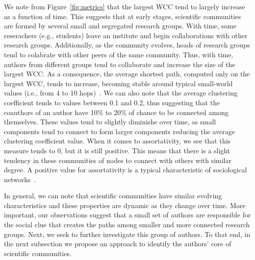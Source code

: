 We note from Figure~\ref{fig:metrics} that the largest WCC tend to largely increase as a function of time. This suggests that at early
stages, scientific communities are formed by several small and segregated research groups. With time, some reserachers (e.g., students) leave an institute and begin collaborations
with other research groups. Additionally, as the community evolves, heads of  research groups tend to colabrate with other peers of the same community. Thus, with time, authors
from different groups tend to collaborate and increase the size of the largest WCC. As a consequence, the average shortest path, computed only on the largest
WCC, tends to increase, becoming stable around typical small-world values (i.e., from 4 to 10 hops)~\cite{mislove-2007-socialnetworks,fourdegrees_facebook}.  We can
also note that the average clustering coefficient tends to values between 0.1 and 0.2, thus suggesting that the coauthors of an author have 10\% to 20\% of chance to be connected
among themselves. These values tend to slightly diminishe over time, as small components tend to connect to form larger components reducing the average clustering coefficient
value.  When it comes to assortativity, we see that this measure tends to 0, but it is still positive. This means that there is a slight tendency in these communities of nodes to
connect with others with similar degree.  A positive value for assortativity is a typical characteristic of sociological networks~\cite{Newman2003}.

In general, we can note that scientific communities have similar evolving characteristics and these properties are dynamic as they change over time.  More important, our
observations suggest that a small set of authors are responsible for the social clue that creates the paths among smaller and more connected research groups. Next, we seek to
further investigate this group of authors. To that end, in the next subsection we propose an approach to identify the authors' core of scientific communities.



